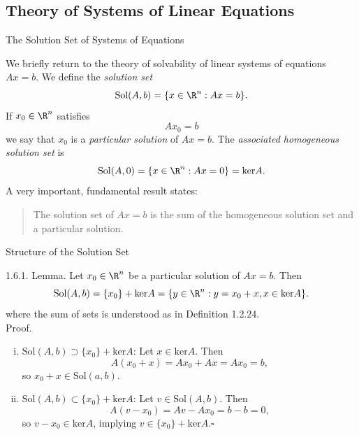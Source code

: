 \documentclass[smaller,hyperref={CJKbookmarks=true}]{beamer}
\begin{document}
\subsection{Theory of Systems of Linear Equations}
\begin{frame}[c]
\begin{spacing}{2.5}
\tableofcontents[sectionstyle=hide,subsectionstyle=show/shaded/hide] \end{spacing}
\end{frame}
\begin{frame}[t,shrink]{The Solution Set of Systems of Equations}
\begin{spacing}{1.1}
We briefly return to the theory of solvability of linear systems of equations $Ax=b$. We define the \emph{solution set}
\[\text{Sol}(A,b)=\{x\in\R^n:Ax=b\}.\]
If $x_0\in\R^n$ satisfies
\[Ax_0=b\]
we say that $x_0$ is a \emph{particular solution} of $Ax=b$. The \emph{associated homogeneous solution set} is
\[\text{Sol}(A,0)=\{x\in\R^n:Ax=0\}=\text{ker}A.\]
A very important, fundamental result states:
\begin{quotation}
The solution set of $Ax = b$ is the sum of the homogeneous solution set and a particular solution.
\end{quotation}
\end{spacing}
\end{frame}
\begin{frame}[t,shrink]{Structure of the Solution Set}
\begin{spacing}{1}
\alert{1.6.1. Lemma.} Let $x_0\in\R^n$ be a particular solution of $Ax=b$. Then
\[\text{Sol}(A,b)=\{x_0\}+\text{ker}A=\{y\in\R^n:y=x_0+x,x\in\text{ker}A\}.\]
where the sum of sets is understood as in Definition 1.2.24.\\[7pt]
\alert{Proof.}
\begin{enumerate}[(i)]
  \item $\text{Sol}(A,b)\supset\{x_0\}+\text{ker}A$: Let $x\in\text{ker}A$. Then
      \[A(x_0+x)=Ax_0+Ax=Ax_0=b,\]
      so $x_0+x\in\text{Sol}(a,b).$
  \item $\text{Sol}(A,b)\subset\{x_0\}+\text{ker}A$: Let $v\in\text{Sol}(A,b)$. Then
      \[A(v-x_0)=Av-Ax_0=b-b=0,\]
      so $v-x_0\in\text{ker}A$, implying $v\in\{x_0\}+\text{ker}A$.$\square$
\end{enumerate}
\end{spacing}
\end{frame}
\end{document}
